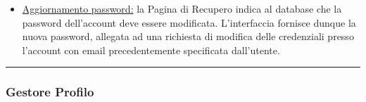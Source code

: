 \documentclass[11pt, a4paper]{article}
\theoremstyle{definition} %
\begin{document}
\begin{description}
\begin{itemize}
        \item \underline{Aggiornamento password:} la Pagina di
        Recupero indica al database che la password dell'account
        deve essere modificata. L'interfaccia fornisce dunque
        la nuova password, allegata ad una richiesta di modifica
        delle credenziali presso l'account con email precedentemente
        specificata dall'utente.
    \end{itemize}
\end{description}

\begin{center}
    \rule{5cm}{1pt}
\end{center}

\subsubsection{Gestore Profilo}
\end{document}
